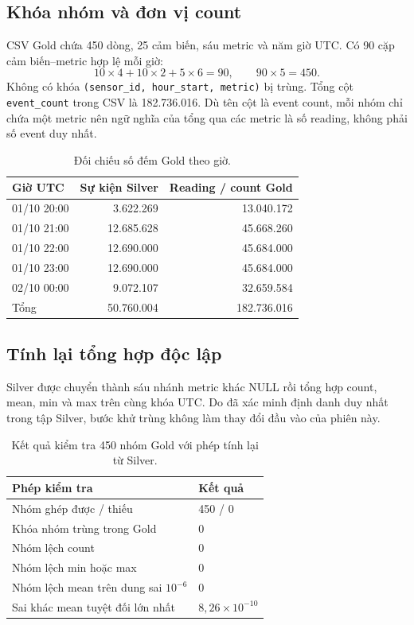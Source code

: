 \subsection{Khóa nhóm và đơn vị count}
CSV Gold chứa 450 dòng, 25 cảm biến, sáu metric và năm giờ UTC. Có 90 cặp cảm biến--metric hợp lệ mỗi giờ:
\[
 10\times4+10\times2+5\times6=90,\qquad 90\times5=450.
\]
Không có khóa \texttt{(sensor\_id, hour\_start, metric)} bị trùng. Tổng cột \texttt{event\_count} trong CSV là 182.736.016. Dù tên cột là event count, mỗi nhóm chỉ chứa một metric nên ngữ nghĩa của tổng qua các metric là số reading, không phải số event duy nhất.

\begin{table}[H]
\centering
\caption{Đối chiếu số đếm Gold theo giờ.}
\label{tab:gold-hourly}
\small
\begin{tabular}{l r r}
\toprule
\textbf{Giờ UTC} & \textbf{Sự kiện Silver} & \textbf{Reading / count Gold} \\
\midrule
01/10 20:00 & 3.622.269 & 13.040.172 \\
01/10 21:00 & 12.685.628 & 45.668.260 \\
01/10 22:00 & 12.690.000 & 45.684.000 \\
01/10 23:00 & 12.690.000 & 45.684.000 \\
02/10 00:00 & 9.072.107 & 32.659.584 \\
\midrule
Tổng & 50.760.004 & 182.736.016 \\
\bottomrule
\end{tabular}
\end{table}

\subsection{Tính lại tổng hợp độc lập}
Silver được chuyển thành sáu nhánh metric khác NULL rồi tổng hợp count, mean, min và max trên cùng khóa UTC. Do đã xác minh định danh duy nhất trong tập Silver, bước khử trùng không làm thay đổi đầu vào của phiên này.

\begin{table}[H]
\centering
\caption{Kết quả kiểm tra 450 nhóm Gold với phép tính lại từ Silver.}
\label{tab:gold-check}
\small
\begin{tabularx}{\textwidth}{l X}
\toprule
\textbf{Phép kiểm tra} & \textbf{Kết quả} \\
\midrule
Nhóm ghép được / thiếu & 450 / 0 \\
Khóa nhóm trùng trong Gold & 0 \\
Nhóm lệch count & 0 \\
Nhóm lệch min hoặc max & 0 \\
Nhóm lệch mean trên dung sai $10^{-6}$ & 0 \\
Sai khác mean tuyệt đối lớn nhất & $8,26\times10^{-10}$ \\
\bottomrule
\end{tabularx}
\end{table}


